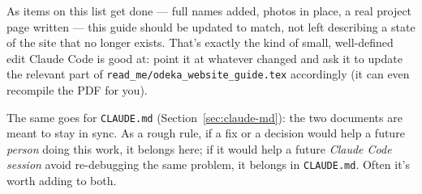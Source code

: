 \documentclass[11pt]{article}
\newcommand{\file}[1]{\texttt{#1}}
\begin{document}
As items on this list get done --- full names added, photos in place,
a real project page written --- this guide should be updated to match,
not left describing a state of the site that no longer exists. That's
exactly the kind of small, well-defined edit Claude Code is good at:
point it at whatever changed and ask it to update the relevant part of
\file{read\_me/odeka\_website\_guide.tex} accordingly (it can even
recompile the PDF for you).

The same goes for \file{CLAUDE.md} (Section~\ref{sec:claude-md}): the two
documents are meant to stay in sync. As a rough rule, if a fix or a
decision would help a future \emph{person} doing this work, it belongs
here; if it would help a future \emph{Claude Code session} avoid
re-debugging the same problem, it belongs in \file{CLAUDE.md}. Often it's
worth adding to both.
\end{document}
